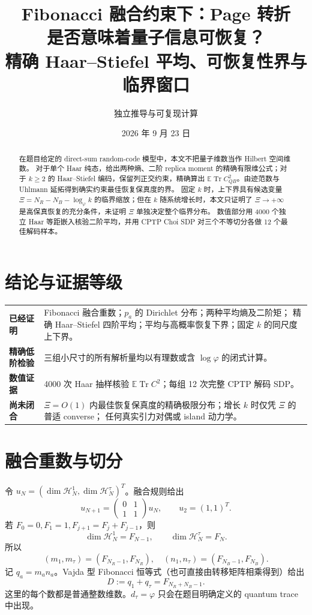 \documentclass[UTF8,11pt,a4paper]{ctexart}
\title{\bfseries Fibonacci 融合约束下：Page 转折\\是否意味着量子信息可恢复？\\[4pt]
\large 精确 Haar--Stiefel 平均、可恢复性界与临界窗口}
\author{独立推导与可复现计算}
\date{2026 年 9 月 23 日}
\theoremstyle{definition}
\newcommand{\Tr}{\operatorname{Tr}}
\newcommand{\E}{\mathbb E}
\newcommand{\cH}{\mathcal H}
\newcommand{\phiG}{\varphi}
\begin{document}
\maketitle

\begin{abstract}
在题目给定的 direct-sum random-code 模型中，本文不把量子维数当作 Hilbert 空间维数。
对于单个 Haar 纯态，给出两种熵、二阶 replica moment 的精确有限维公式；对于
$k\ge2$ 的 Haar--Stiefel 编码，保留列正交约束，精确算出
$\E\Tr C_{QB}^{2}$。由迹范数与 Uhlmann 延拓得到确实约束最佳恢复保真度的界。
固定 $k$ 时，上下界具有候选变量
$\Xi=N_R-N_B-\log_{\phiG}k$ 的临界缩放；但在 $k$ 随系统增长时，本文只证明了
$\Xi\to+\infty$ 是高保真恢复的充分条件，未证明 $\Xi$ 单独决定整个临界分布。
数值部分用 4000 个独立 Haar 等距嵌入核验二阶平均，并用 CPTP Choi SDP 对三个不等切分各做
12 个最佳解码样本。
\end{abstract}

\section*{结论与证据等级}

\begin{center}
\begin{tabularx}{\textwidth}{>{\bfseries}p{2.8cm}X}
\toprule
已经证明 & Fibonacci 融合重数；$p_a$ 的 Dirichlet 分布；两种平均熵及二阶矩；
精确 Haar--Stiefel 四阶平均；平均与高概率恢复下界；固定 $k$ 的同尺度上下界。\\
精确低阶检验 & 三组小尺寸的所有解析量均以有理数或含 $\log\phiG$ 的闭式计算。\\
数值证据 & 4000 次 Haar 抽样核验 $\E\Tr C^2$；每组 12 次完整 CPTP 解码 SDP。\\
尚未闭合 & $\Xi=O(1)$ 内最佳恢复保真度的精确极限分布；增长 $k$ 时仅凭 $\Xi$ 的普适 converse；
任何真实引力对偶或 island 动力学。\\
\bottomrule
\end{tabularx}
\end{center}

\section{融合重数与切分}

令 $u_N=(\dim\cH_N^1,\dim\cH_N^\tau)^T$。融合规则给出
\[
u_{N+1}=\begin{pmatrix}0&1\\1&1\end{pmatrix}u_N,
\qquad u_2=(1,1)^T.
\]
若 $F_0=0,F_1=1,F_{j+1}=F_j+F_{j-1}$，则
\begin{equation}
\dim\cH_N^1=F_{N-1},\qquad \dim\cH_N^\tau=F_N.             \tag{1}
\end{equation}
所以
\[
(m_1,m_\tau)=(F_{N_R-1},F_{N_R}),\quad
(n_1,n_\tau)=(F_{N_B-1},F_{N_B}).
\]
记 $q_a=m_an_a$。Vajda 型 Fibonacci 恒等式（也可直接由转移矩阵相乘得到）给出
\begin{equation}
D:=q_1+q_\tau=F_{N_R+N_B-1}.                              \tag{2}
\end{equation}
这里的每个数都是普通整数维数。$d_\tau=\phiG$ 只会在题目明确定义的 quantum trace 中出现。
\end{document}
